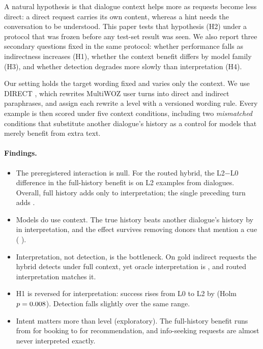 \documentclass{article}
\begin{document}
A natural hypothesis is that dialogue context helps more as requests become less direct: a direct
request carries its own content, whereas a hint needs the conversation to be understood. This
paper tests that hypothesis (H2) under a protocol that was frozen before any test-set result was
seen. We also report three secondary questions fixed in the same protocol: whether performance
falls as indirectness increases (H1), whether the context benefit differs by model family (H3),
and whether detection degrades more slowly than interpretation (H4).

Our setting holds the target wording fixed and varies only the context. We use DIRECT
\citep{takayama2021direct}, which rewrites MultiWOZ \citep{budzianowski2018multiwoz,eric2020multiwoz21}
user turns into direct and indirect paraphrases, and assign each rewrite a level with a versioned
wording rule. Every example is then scored under five context conditions, including two
\emph{mismatched} conditions that substitute another dialogue's history as a control for models
that merely benefit from extra text.

\paragraph{Findings.}
\begin{itemize}
  \item The preregistered interaction is null. For the routed hybrid, the L2$-$L0 difference in
        the full-history benefit is \PrimaryEst{} \PrimaryCI{} on \PrimaryExamples{} L2 examples
        from \PrimaryDialogues{} dialogues. Overall, full history adds only \FullNoneEst{}
        \FullNoneCI{} to interpretation; the single preceding turn adds \OneNoneEst{} \OneNoneCI.
  \item Models do use context. The true history beats another dialogue's history by
        \ControlEst{} \ControlCI{} in interpretation, and the effect survives removing donors that
        mention a cue (\CueFreeEst{} \CueFreeCI).
  \item Interpretation, not detection, is the bottleneck. On gold indirect requests the hybrid
        detects \DetectFull{} under full context, yet oracle interpretation is \OracleFull, and
        routed interpretation matches it.
  \item H1 is reversed for interpretation: success rises from L0 to L2 by \HoneEst{} \HoneCI{}
        (Holm $p=0.008$). Detection falls slightly over the same range.
  \item Intent matters more than level (exploratory). The full-history benefit runs from
        \IntentBookingEst{} for booking to \IntentRecommendationEst{} for recommendation, and
        info-seeking requests are almost never interpreted exactly.
\end{itemize}
\end{document}
